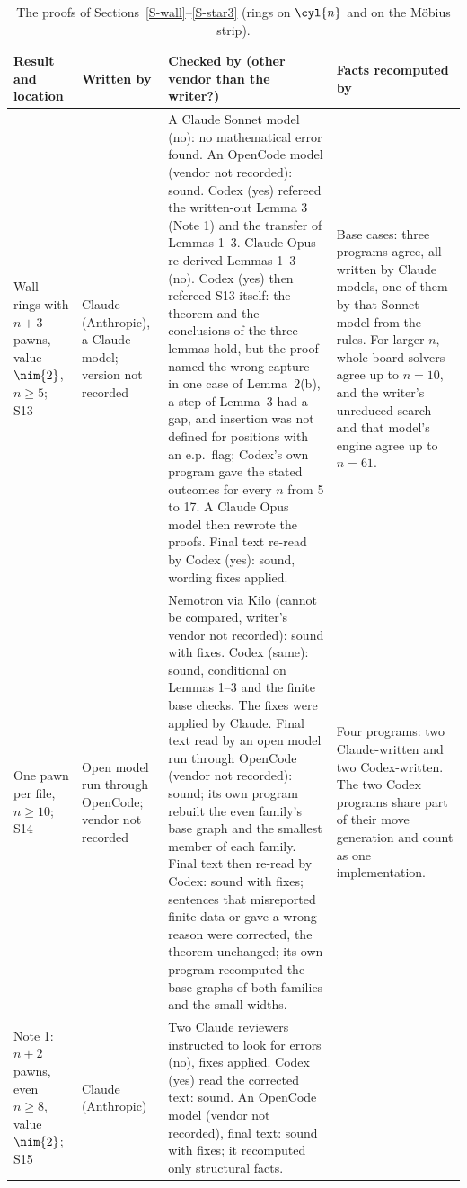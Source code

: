 \begin{table}[!htbp]
\centering
\caption{The proofs of Sections~\ref{S-wall}--\ref{S-star3} (rings on $\cyl{n}$ and on the M\"obius strip).}
\label{tab:provring}
\footnotesize
\setlength{\tabcolsep}{3pt}
\begin{tabular}{@{}Y{3.0cm}Y{2.9cm}Y{6.4cm}Y{3.7cm}@{}}
\toprule
Result and location & Written by & Checked by (other vendor than the writer?) & Facts recomputed by\\
\midrule
Wall rings with $n+3$ pawns, value $\nim{2}$, $n\ge5$; S13 &
Claude (Anthropic), a Claude model; version not recorded &
A Claude Sonnet model (no): no mathematical error found. An OpenCode model (vendor not recorded): sound. Codex (yes)
refereed the written-out Lemma 3 (Note 1) and the transfer of Lemmas 1--3. Claude Opus
re-derived Lemmas 1--3 (no). Codex (yes) then refereed S13 itself: the theorem and the conclusions of the three lemmas hold, but the proof named the wrong capture in one case of Lemma~2(b), a step of Lemma~3 had a gap, and insertion was not defined for positions with an e.p.\ flag; Codex's own program gave the stated outcomes for every $n$ from 5 to 17. A Claude Opus model then rewrote the proofs. Final text re-read by Codex (yes): sound, wording fixes applied. &
Base cases: three programs agree, all written by Claude models, one of them by that Sonnet model from the rules. For larger $n$, whole-board solvers agree up to $n=10$, and the writer's unreduced search and that
model's engine agree up to $n=61$.\\
\addlinespace
One pawn per file, $n\ge10$; S14 &
Open model run through OpenCode; vendor not recorded &
Nemotron via Kilo (cannot be compared, writer's vendor not recorded): sound with fixes. Codex (same): sound, conditional on
Lemmas 1--3 and the finite base checks. The fixes were applied by Claude. Final text read by an open model run through OpenCode (vendor not recorded): sound; its own program rebuilt the even family's base graph and the smallest member of each family. Final text then re-read by Codex: sound with fixes; sentences that misreported finite data or gave a wrong reason were corrected, the theorem unchanged; its own program recomputed the base graphs of both families and the small widths. &
Four programs: two Claude-written and two Codex-written. The two Codex programs share part of their move generation and count as one implementation.\\
\addlinespace
Note 1: $n+2$ pawns, even $n\ge8$, value $\nim{2}$; S15 &
Claude (Anthropic) &
Two Claude reviewers instructed to look for errors (no), fixes applied. Codex (yes) read the corrected text: sound. An OpenCode model (vendor not recorded), final text: sound with fixes; it recomputed only structural facts. &

\end{tabular}
\end{table}
